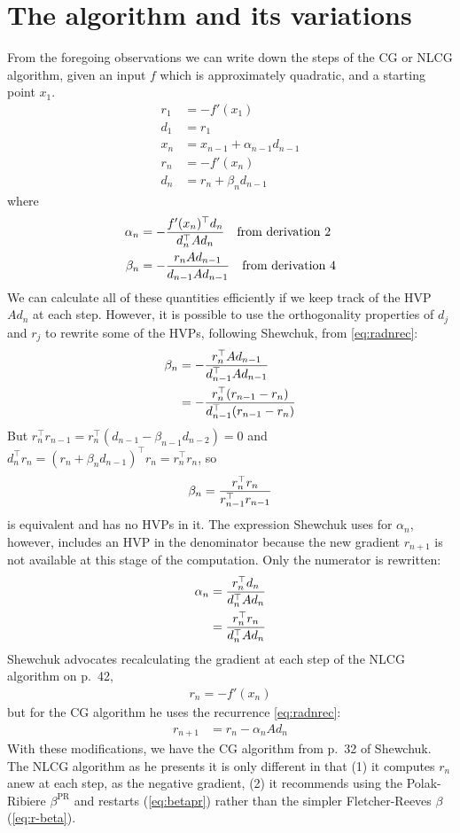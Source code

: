 \documentclass[11pt]{article}
\newcommand{\T}{\top}
\renewcommand{\(}{\left(}
\renewcommand{\)}{\right)}
\newcommand{\betapr}{\beta^{\mathrm{PR}}}
\begin{document}

\section{The algorithm and its variations}

From the foregoing observations we can write down the steps of the CG
or NLCG algorithm, given an input $f$ which is approximately
quadratic, and a starting point $x_1$.
\begin{align}
r_1 &= -f'(x_1) \\
d_1 &= r_1 \\
x_n &= x_{n-1}+\alpha_{n-1}d_{n-1} \\
r_n &= -f'(x_n) \\
d_n &= r_n + \beta_n d_{n-1}
\end{align}
where
\begin{align}
\alpha_n &= -{f'(x_n)^\T d_n \over d_n^\T A d_n}
\textrm{\quad from derivation 2} \\
\beta_n &= -{r_n A d_{n-1} \over d_{n-1}A d_{n-1}}
\textrm{\quad from derivation 4} \\
\end{align}
We can calculate all of these quantities efficiently if we keep track
of the HVP $A d_n$ at each step. However, it is possible to use the
orthogonality properties of $d_j$ and $r_j$ to rewrite some of the
HVPs, following Shewchuk, from \ref{eq:radnrec}:
\begin{align}
\beta_n &= -{r_n^\T A d_{n-1} \over d_{n-1}^\T A d_{n-1}} \\
 &= -{r_n^\T (r_{n-1}-r_n) \over d_{n-1}^\T (r_{n-1}-r_n)}
\end{align}
But $r_n^\T r_{n-1} = r_n^\T(d_{n-1}-\beta_{n-1}d_{n-2}) = 0$ and
$d_n^\T r_n = (r_n + \beta_n d_{n-1})^\T r_n = r_n^\T r_n$, so
\begin{align}
\beta_n = {r_n^\T r_n \over r_{n-1}^\T r_{n-1}} \label{eq:r-beta}
\end{align}
is equivalent and has no HVPs in it. The expression Shewchuk uses for
$\alpha_n$, however, includes an HVP in the denominator because the
new gradient $r_{n+1}$ is not available at this stage of the
computation. Only the numerator is rewritten:
\begin{align}
\alpha_n &= {r_n^\T d_n \over d_n^\T A d_n} \\
&= {r_n^\T r_n \over d_n^\T A d_n}
\end{align}
Shewchuk advocates recalculating the gradient at each step of the NLCG
algorithm on p.~42,
\begin{align}
r_n = -f'(x_n)
\end{align}
but for the CG algorithm he uses the recurrence
\ref{eq:radnrec}:
\begin{align*}
r_{n+1} &= r_n - \alpha_n A d_n
\end{align*}
With these modifications, we have the CG algorithm from p.~32 of
Shewchuk. The NLCG algorithm as he presents it is only different in
that (1) it computes $r_n$ anew at each step, as the negative
gradient, (2) it recommends using the Polak-Ribiere $\betapr$ and
restarts (\ref{eq:betapr}) rather than the simpler Fletcher-Reeves
$\beta$ (\ref{eq:r-beta}).
\end{document}
